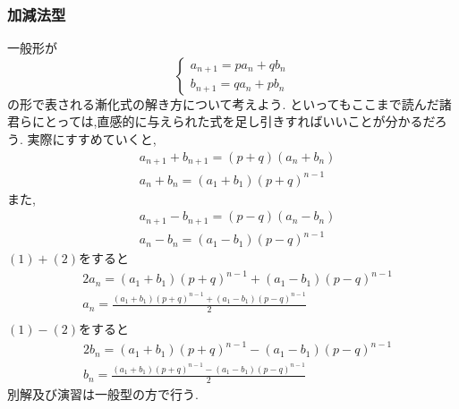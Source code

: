 
\subsubsection{加減法型}
一般形が
\[
  \begin{cases}
    a_{n+1}=pa_{n}+qb_{n} \\
    b_{n+1}=qa_{n}+pb_{n}
  \end{cases}
\]
の形で表される漸化式の解き方について考えよう.
といってもここまで読んだ諸君らにとっては,直感的に与えられた式を足し引きすればいいことが分かるだろう.
実際にすすめていくと,
\begin{align*}
   & a_{n+1}+b_{n+1}=(p+q)(a_{n}+b_{n})  \\
   & a_n+b_n=(a_1+b_1)(p+q)^{n-1}\tag{1}
\end{align*}
また,
\begin{align*}
   & a_{n+1}-b_{n+1}=(p-q)(a_{n}-b_{n})  \\
   & a_n-b_n=(a_1-b_1)(p-q)^{n-1}\tag{2}
\end{align*}
$(1)+(2)$をすると
\begin{align*}
  &2a_n=(a_1+b_1)(p+q)^{n-1}+(a_1-b_1)(p-q)^{n-1}\\
  &a_n=\frac{(a_1+b_1)(p+q)^{n-1}+(a_1-b_1)(p-q)^{n-1}}{2}\\
\end{align*}
$(1)-(2)$をすると
\begin{align*}
  &2b_n=(a_1+b_1)(p+q)^{n-1}-(a_1-b_1)(p-q)^{n-1}\\
  &b_n=\frac{(a_1+b_1)(p+q)^{n-1}-(a_1-b_1)(p-q)^{n-1}}{2}
\end{align*}
別解及び演習は一般型の方で行う.
